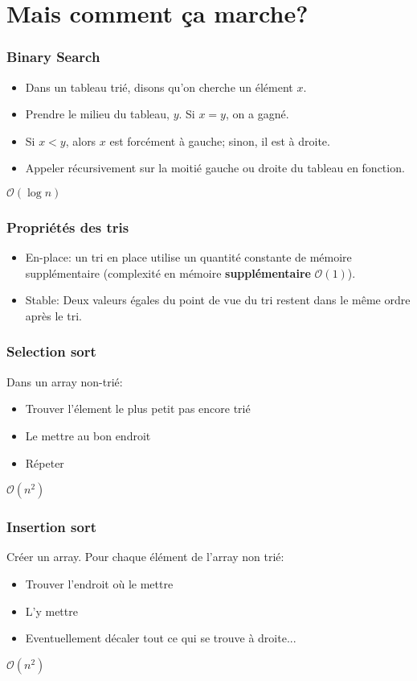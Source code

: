 \documentclass[8pt,aspectratio=169]{beamer}
\begin{document}
\section{Mais comment ça marche?}

\begin{frame}
\frametitle{Binary Search}
\begin{itemize}
	\item Dans un tableau trié, disons qu'on cherche un élément $x$.
	\item Prendre le milieu du tableau, $y$. Si $x=y$, on a gagné.
	\item Si $x < y$, alors $x$ est forcément à gauche; sinon, il est à droite.
	\item Appeler récursivement sur la moitié gauche ou droite du tableau en fonction.
\end{itemize}
$\mathcal{O}(\log n)$
\end{frame}

\begin{frame}
\frametitle{Propriétés des tris}
\begin{itemize}
	\item En-place: un tri en place utilise un quantité constante de mémoire supplémentaire (complexité en mémoire \textbf{supplémentaire} $\mathcal{O}(1)$).
	\item Stable: Deux valeurs égales du point de vue du tri restent dans le même ordre après le tri.
\end{itemize}
\end{frame}

\begin{frame}
\frametitle{Selection sort}
Dans un array non-trié:
\begin{itemize}
	\item Trouver l'élement le plus petit pas encore trié
	\item Le mettre au bon endroit
	\item Répeter
\end{itemize}
$\mathcal{O}(n^2)$
\end{frame}

\begin{frame}
\frametitle{Insertion sort}
Créer un array. Pour chaque élément de l'array non trié:
\begin{itemize}
	\item Trouver l'endroit où le mettre
	\item L'y mettre
	\item Eventuellement décaler tout ce qui se trouve à droite...
\end{itemize}
$\mathcal{O}(n^2)$
\end{frame}
\end{document}
